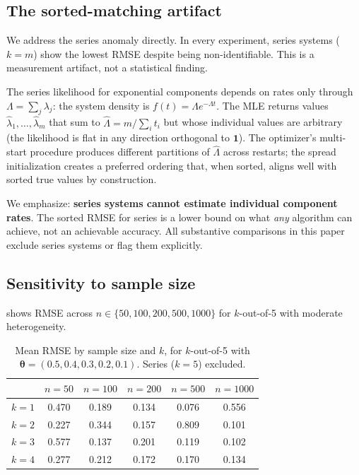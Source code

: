 \documentclass[12pt]{article}
\theoremstyle{definition}
\theoremstyle{remark}
\newcommand{\bone}{\mathbf{1}}
\newcommand{\bthet}{\boldsymbol{\theta}}
\begin{document}
\subsection{The sorted-matching artifact}
\label{sec:res_artifact}

We address the series anomaly directly.  In every experiment, series
systems ($k = m$) show the lowest RMSE despite being
non-identifiable.  This is a measurement artifact, not a statistical
finding.

The series likelihood for exponential components depends on rates only
through $\Lambda = \sum_j \lambda_j$: the system density is
$f(t) = \Lambda e^{-\Lambda t}$.  The MLE returns values
$\hat\lambda_1, \ldots, \hat\lambda_m$ that sum to
$\hat\Lambda = m/\sum_i t_i$ but whose individual values are
arbitrary (the likelihood is flat in any direction orthogonal to
$\bone$).  The optimizer's multi-start procedure produces different
partitions of $\hat\Lambda$ across restarts; the spread
initialization creates a preferred ordering that, when sorted, aligns
well with sorted true values by construction.

We emphasize: \textbf{series systems cannot estimate individual
  component rates}.  The sorted RMSE for series is a lower bound on
what \emph{any} algorithm can achieve, not an achievable accuracy.
All substantive comparisons in this paper exclude series systems or
flag them explicitly.


\subsection{Sensitivity to sample size}
\label{sec:res_samplesize}

 shows RMSE across $n \in \{50, 100, 200, 500, 1000\}$
for $k$-out-of-5 with moderate heterogeneity.

\begin{table}[htbp]
  \centering
  \caption{Mean RMSE by sample size and $k$, for
    $k$-out-of-5 with $\bthet = (0.5, 0.4, 0.3, 0.2, 0.1)$.
    Series ($k = 5$) excluded.}
  \label{tab:sample_size}
  \begin{tabular}{lccccc}
    \toprule
    & $n = 50$ & $n = 100$ & $n = 200$ & $n = 500$ & $n = 1000$ \\
    \midrule
    $k = 1$ & 0.470 & 0.189 & 0.134 & 0.076 & 0.556 \\
    $k = 2$ & 0.227 & 0.344 & 0.157 & 0.809 & 0.101 \\
    $k = 3$ & 0.577 & 0.137 & 0.201 & 0.119 & 0.102 \\
    $k = 4$ & 0.277 & 0.212 & 0.172 & 0.170 & 0.134 \\
    \bottomrule
  \end{tabular}
\end{table}
\end{document}
